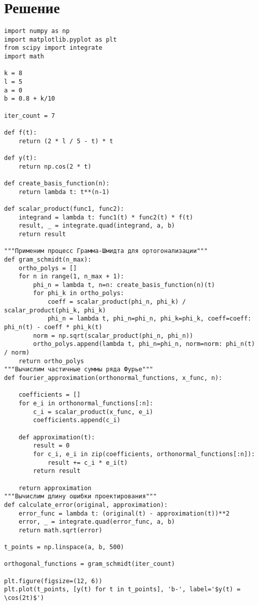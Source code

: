 \documentclass{article}
\begin{document}
\section{Решение}
\begin{verbatim}
import numpy as np
import matplotlib.pyplot as plt
from scipy import integrate
import math

k = 8
l = 5
a = 0
b = 0.8 + k/10

iter_count = 7

def f(t):
    return (2 * l / 5 - t) * t

def y(t):
    return np.cos(2 * t)

def create_basis_function(n):
    return lambda t: t**(n-1)

def scalar_product(func1, func2):
    integrand = lambda t: func1(t) * func2(t) * f(t)
    result, _ = integrate.quad(integrand, a, b)
    return result

"""Применим процесс Грамма-Шмидта для ортогонализации"""
def gram_schmidt(n_max):
    ortho_polys = []
    for n in range(1, n_max + 1):
        phi_n = lambda t, n=n: create_basis_function(n)(t)
        for phi_k in ortho_polys:
            coeff = scalar_product(phi_n, phi_k) / scalar_product(phi_k, phi_k)
            phi_n = lambda t, phi_n=phi_n, phi_k=phi_k, coeff=coeff: phi_n(t) - coeff * phi_k(t)
        norm = np.sqrt(scalar_product(phi_n, phi_n))
        ortho_polys.append(lambda t, phi_n=phi_n, norm=norm: phi_n(t) / norm)
    return ortho_polys
"""Вычислим частичные суммы ряда Фурье"""
def fourier_approximation(orthonormal_functions, x_func, n):

    coefficients = []
    for e_i in orthonormal_functions[:n]:
        c_i = scalar_product(x_func, e_i)
        coefficients.append(c_i)
    
    def approximation(t):
        result = 0
        for c_i, e_i in zip(coefficients, orthonormal_functions[:n]):
            result += c_i * e_i(t)
        return result
    
    return approximation
"""Вычислим длину ошибки проектирования"""
def calculate_error(original, approximation):
    error_func = lambda t: (original(t) - approximation(t))**2
    error, _ = integrate.quad(error_func, a, b)
    return math.sqrt(error)

t_points = np.linspace(a, b, 500)

orthogonal_functions = gram_schmidt(iter_count)

plt.figure(figsize=(12, 6))
plt.plot(t_points, [y(t) for t in t_points], 'b-', label='$y(t) = \cos(2t)$')


\end{verbatim}
\end{document}
